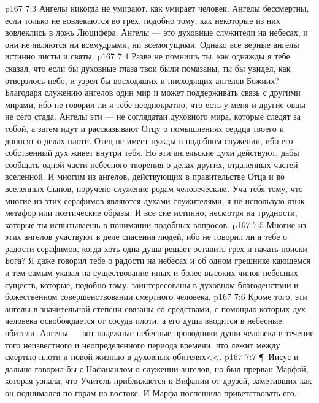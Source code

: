 \vs p167 7:3 Ангелы никогда не умирают, как умирает человек. Ангелы бессмертны, если только не вовлекаются во грех, подобно тому, как некоторые из них вовлеклись в ложь Люцифера. Ангелы --- это духовные служители на небесах, и они не являются ни всемудрыми, ни всемогущими. Однако все верные ангелы истинно чисты и святы.
\vs p167 7:4 Разве не помнишь ты, как однажды я тебе сказал, что если бы духовные глаза твои были помазаны, ты бы увидел, как отверзлось небо, и узрел бы восходящих и нисходящих ангелов Божиих? Благодаря служению ангелов один мир и может поддерживать связь с другими мирами, ибо не говорил ли я тебе неоднократно, что есть у меня и другие овцы не сего стада. Ангелы эти --- не соглядатаи духовного мира, которые следят за тобой, а затем идут и рассказывают Отцу о помышлениях сердца твоего и доносят о делах плоти. Отец не имеет нужды в подобном служении, ибо его собственный дух живет внутри тебя. Но эти ангельские духи действуют, дабы сообщать одной части небесного творения о делах других, отдаленных частей вселенной. И многим из ангелов, действующих в правительстве Отца и во вселенных Сынов, поручено служение родам человеческим. Уча тебя тому, что многие из этих серафимов являются духами\hyp{}служителями, я не использую язык метафор или поэтические образы. И все сие истинно, несмотря на трудности, которые ты испытываешь в понимании подобных вопросов.
\vs p167 7:5 Многие из этих ангелов участвуют в деле спасения людей, ибо не говорил ли я тебе о радости серафимов, когда хоть одна душа решает оставить грех и начать поиски Бога? Я даже говорил тебе о радости  на небесах и об одном грешнике кающемся и тем самым указал на существование иных и более высоких чинов небесных существ, которые, подобно тому, заинтересованы в духовном благоденствии и божественном совершенствовании смертного человека.
\vs p167 7:6 Кроме того, эти ангелы в значительной степени связаны со средствами, с помощью которых дух человека освобождается от сосуда плоти, а его душа вводится в небесные обители. Ангелы --- вот надежные небесные проводники души человека в течение того неизвестного и неопределенного периода времени, что лежит между смертью плоти и новой жизнью в духовных обителях<<.
\vs p167 7:7 \P\ Иисус и дальше говорил бы с Нафанаилом о служении ангелов, но был прерван Марфой, которая узнала, что Учитель приближается к Вифании от друзей, заметивших как он поднимался по горам на востоке. И Марфа поспешила приветствовать его.
